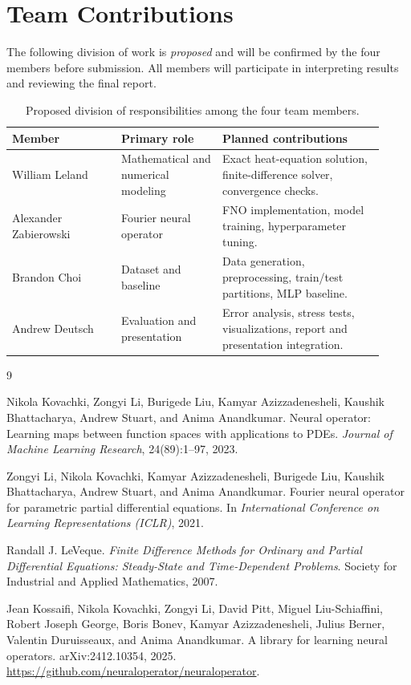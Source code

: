 \documentclass{article}
\begin{document}
\section{Team Contributions}
The following division of work is \emph{proposed} and will be confirmed by the four members before submission. All members will participate in interpreting results and reviewing the final report.
\begin{table}[h]
\centering
\caption{Proposed division of responsibilities among the four team members.}
\begin{tabular}{@{}p{0.27\linewidth}p{0.25\linewidth}p{0.40\linewidth}@{}}
\toprule
\textbf{Member} & \textbf{Primary role} & \textbf{Planned contributions}\\
\midrule
William Leland & Mathematical and numerical modeling & Exact heat-equation solution, finite-difference solver, convergence checks.\\
Alexander Zabierowski & Fourier neural operator & FNO implementation, model training, hyperparameter tuning.\\
Brandon Choi & Dataset and baseline & Data generation, preprocessing, train/test partitions, MLP baseline.\\
Andrew Deutsch & Evaluation and presentation & Error analysis, stress tests, visualizations, report and presentation integration.\\
\bottomrule
\end{tabular}
\label{tab:roles}
\end{table}

\begin{thebibliography}{9}

Nikola Kovachki, Zongyi Li, Burigede Liu, Kamyar Azizzadenesheli,
Kaushik Bhattacharya, Andrew Stuart, and Anima Anandkumar.
\newblock Neural operator: Learning maps between function spaces with applications to PDEs.
\newblock \emph{Journal of Machine Learning Research}, 24(89):1--97, 2023.

Zongyi Li, Nikola Kovachki, Kamyar Azizzadenesheli, Burigede Liu,
Kaushik Bhattacharya, Andrew Stuart, and Anima Anandkumar.
\newblock Fourier neural operator for parametric partial differential equations.
\newblock In \emph{International Conference on Learning Representations (ICLR)}, 2021.

Randall J. LeVeque.
\newblock \emph{Finite Difference Methods for Ordinary and Partial Differential Equations: Steady-State and Time-Dependent Problems}.
\newblock Society for Industrial and Applied Mathematics, 2007.

Jean Kossaifi, Nikola Kovachki, Zongyi Li, David Pitt, Miguel Liu-Schiaffini,
Robert Joseph George, Boris Bonev, Kamyar Azizzadenesheli,
Julius Berner, Valentin Duruisseaux, and Anima Anandkumar.
\newblock A library for learning neural operators.
\newblock arXiv:2412.10354, 2025. \url{https://github.com/neuraloperator/neuraloperator}.

\end{thebibliography}
\end{document}
